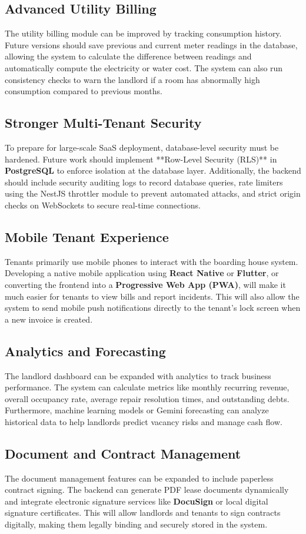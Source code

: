 \subsection{Advanced Utility Billing}
The utility billing module can be improved by tracking consumption history. Future versions should save previous and current meter readings in the database, allowing the system to calculate the difference between readings and automatically compute the electricity or water cost. The system can also run consistency checks to warn the landlord if a room has abnormally high consumption compared to previous months.

\subsection{Stronger Multi-Tenant Security}
To prepare for large-scale SaaS deployment, database-level security must be hardened. Future work should implement **Row-Level Security (RLS)** in \textbf{PostgreSQL} to enforce isolation at the database layer. Additionally, the backend should include security auditing logs to record database queries, rate limiters using the NestJS throttler module to prevent automated attacks, and strict origin checks on WebSockets to secure real-time connections.

\subsection{Mobile Tenant Experience}
Tenants primarily use mobile phones to interact with the boarding house system. Developing a native mobile application using \textbf{React Native} or \textbf{Flutter}, or converting the frontend into a \textbf{Progressive Web App (PWA)}, will make it much easier for tenants to view bills and report incidents. This will also allow the system to send mobile push notifications directly to the tenant's lock screen when a new invoice is created.

\subsection{Analytics and Forecasting}
The landlord dashboard can be expanded with analytics to track business performance. The system can calculate metrics like monthly recurring revenue, overall occupancy rate, average repair resolution times, and outstanding debts. Furthermore, machine learning models or Gemini forecasting can analyze historical data to help landlords predict vacancy risks and manage cash flow.

\subsection{Document and Contract Management}
The document management features can be expanded to include paperless contract signing. The backend can generate PDF lease documents dynamically and integrate electronic signature services like \textbf{DocuSign} or local digital signature certificates. This will allow landlords and tenants to sign contracts digitally, making them legally binding and securely stored in the system.
